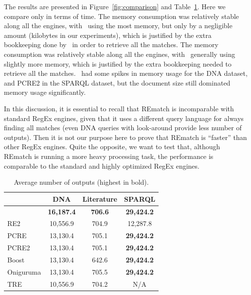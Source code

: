 The results are presented in Figure~\ref{fig:comparison} and Table~\ref{tab:outputs}. Here we compare only in terms of time. The memory consumption was relatively stable along all the engines, with \rematch\ using the most memory, but only by a negligible amount (kilobytes in our experiments), which is justified by the extra bookkeeping done by \rematch\ in order to retrieve all the matches.
The memory consumption was relatively stable along all the engines, with \rematch\ generally using slightly more memory, which is justified by the extra bookkeeping needed to retrieve all the matches. \rematch\ had some spikes in memory usage for the \textsf{DNA} dataset, and  \textsf{PCRE2} in the \textsf{SPARQL} dataset, but the document size still dominated memory usage significantly.

In this discussion, it is essential to recall that REmatch is incomparable with standard RegEx engines, given that it uses a different query language for always finding all matches (even DNA queries with look-around provide less number of outputs). Then it is not our purpose here to prove that REmatch is ``faster'' than other RegEx engines. Quite the opposite, we want to test that, although REmatch is running a more heavy processing task, the performance is comparable to the standard and highly optimized RegEx engines.

\begin{table}
	\begin{tabular}{l|ccc}
		                   & \textsf{DNA}      & \textsf{Literature} & \textsf{SPARQL}   \\
		\hline
		\rematch           & \textbf{16,187.4} & \textbf{706.6}      & \textbf{29,424.2} \\
		\textsf{RE2}       & 10,556.9          & 704.9               & 12,287.8          \\
		\textsf{PCRE}      & 13,130.4          & 705.1               & \textbf{29,424.2} \\
		\textsf{PCRE2}     & 13,130.4          & 705.1               & \textbf{29,424.2} \\
		\textsf{Boost}     & 13,130.4          & 642.6               & \textbf{29,424.2} \\
		\textsf{Oniguruma} & 13,130.4          & 705.5               & \textbf{29,424.2} \\
		\textsf{TRE}       & 10,556.9          & 704.2               & N/A
	\end{tabular}
	\caption{Average number of outputs (highest in bold).}
	\label{tab:outputs}
\end{table}

